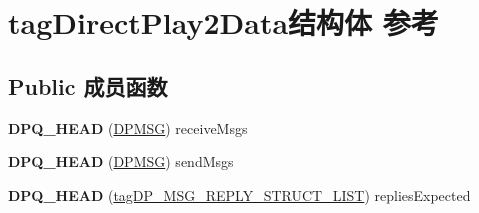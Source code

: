 \hypertarget{structtag_direct_play2_data}{}\section{tag\+Direct\+Play2\+Data结构体 参考}
\label{structtag_direct_play2_data}
\subsection*{Public 成员函数}
\begin{DoxyCompactItemize}
\item 
\mbox{\label{structtag_direct_play2_data_ab0fd68ed49608496bc677795fc994af1}} 
{\bfseries D\+P\+Q\+\_\+\+H\+E\+AD} (\hyperlink{struct_d_p_m_s_g}{D\+P\+M\+SG}) receive\+Msgs
\item 
\mbox{\label{structtag_direct_play2_data_a3a7810cb66ef691147e2a5eb34e1825a}} 
{\bfseries D\+P\+Q\+\_\+\+H\+E\+AD} (\hyperlink{struct_d_p_m_s_g}{D\+P\+M\+SG}) send\+Msgs
\item 
\mbox{\label{structtag_direct_play2_data_ab794631ba69b1717a46a887c412abccf}} 
{\bfseries D\+P\+Q\+\_\+\+H\+E\+AD} (\hyperlink{structtag_d_p___m_s_g___r_e_p_l_y___s_t_r_u_c_t___l_i_s_t}{tag\+D\+P\+\_\+\+M\+S\+G\+\_\+\+R\+E\+P\+L\+Y\+\_\+\+S\+T\+R\+U\+C\+T\+\_\+\+L\+I\+ST}) replies\+Expected
\end{DoxyCompactItemize}
